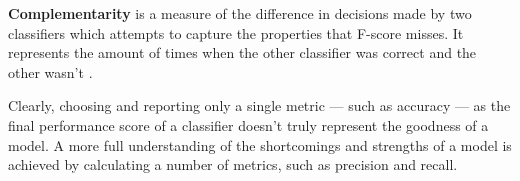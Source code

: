 \textbf{Complementarity} \cite{brill1998} is a measure of the difference in decisions made by two classifiers which attempts to capture the properties that F-score misses.
It represents the amount of times when the other classifier was correct and the other wasn't \cite{derczynski2016}.

Clearly, choosing and reporting only a single metric --- such as accuracy --- as the final performance score of a classifier doesn't truly represent the goodness of a model.
A more full understanding of the shortcomings and strengths of a model is achieved by calculating a number of metrics, such as precision and recall.
